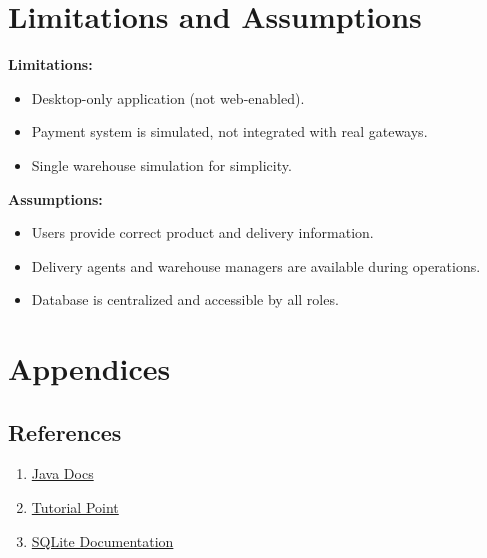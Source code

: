 \documentclass[12pt,a4paper]{article}
\begin{document}
\section{Limitations and Assumptions}
\textbf{Limitations:}
\begin{itemize}
    \item Desktop-only application (not web-enabled).
    \item Payment system is simulated, not integrated with real gateways.
    \item Single warehouse simulation for simplicity.
\end{itemize}

\textbf{Assumptions:}
\begin{itemize}
    \item Users provide correct product and delivery information.
    \item Delivery agents and warehouse managers are available during operations.
    \item Database is centralized and accessible by all roles.
\end{itemize}

\section{Appendices}
\subsection{References}
\begin{enumerate}
    \item \href{https://dev.java/}{Java Docs}
    \item \href{https://www.tutorialspoint.com/}{Tutorial Point}
    \item \href{https://www.sqlite.org/docs.html}{SQLite Documentation}
\end{enumerate}
\end{document}
